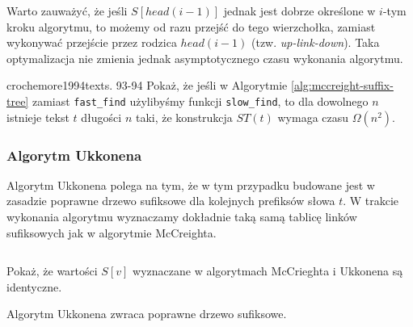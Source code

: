 Warto zauważyć, że jeśli $S[head(i - 1)]$ jednak jest dobrze określone w $i$-tym kroku algorytmu, to możemy od razu przejść do tego wierzchołka, zamiast wykonywać przejście przez rodzica $head(i - 1)$ (tzw. \emph{up-link-down}). Taka optymalizacja nie zmienia jednak asymptotycznego czasu wykonania algorytmu.

\begin{problem}{crochemore1994text}{s. 93-94}
  Pokaż, że jeśli w Algorytmie \ref{alg:mccreight-suffix-tree} zamiast \texttt{fast\_find} użylibyśmy funkcji \texttt{slow\_find}, to dla dowolnego $n$ istnieje tekst $t$ długości $n$ taki, że konstrukcja $ST(t)$ wymaga czasu $\Omega(n^2)$.
\end{problem}


\subsubsection{Algorytm Ukkonena}

Algorytm Ukkonena polega na tym, że w tym przypadku budowane jest w zasadzie poprawne drzewo sufiksowe dla kolejnych prefiksów słowa $t$.
W trakcie wykonania algorytmu wyznaczamy dokładnie taką samą tablicę linków sufiksowych jak w algorytmie McCreighta.

\begin{code}
\inputminted{python}{code/suffix-tree/ukkonen.py}
\label{alg:ukkonen-suffix-tree}
\end{code}

\begin{problem}{}{}
  Pokaż, że wartości $S[v]$ wyznaczane w algorytmach McCrieghta i Ukkonena są identyczne.
\end{problem}

\begin{theorem}{}{}
  Algorytm Ukkonena zwraca poprawne drzewo sufiksowe.
\end{theorem}


